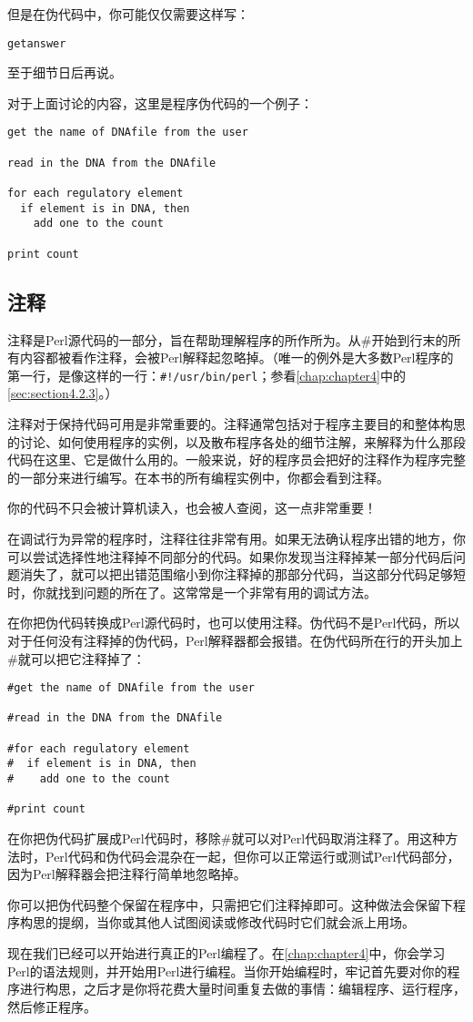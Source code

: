 但是在伪代码中，你可能仅仅需要这样写：

\begin{lstlisting}
getanswer
\end{lstlisting}

至于细节日后再说。

对于上面讨论的内容，这里是程序伪代码的一个例子：

\begin{lstlisting}
get the name of DNAfile from the user

read in the DNA from the DNAfile

for each regulatory element
  if element is in DNA, then
    add one to the count

print count
\end{lstlisting}

\subsection{注释}
注释是Perl源代码的一部分，旨在帮助理解程序的所作所为。从\#开始到行末的所有内容都被看作注释，会被Perl解释起忽略掉。（唯一的例外是大多数Perl程序的第一行，是像这样的一行：\verb|#!/usr/bin/perl|；参看\autoref{chap:chapter4}中的\autoref{sec:section4.2.3}。）

注释对于保持代码可用是非常重要的。注释通常包括对于程序主要目的和整体构思的讨论、如何使用程序的实例，以及散布程序各处的细节注解，来解释为什么那段代码在这里、它是做什么用的。一般来说，好的程序员会把好的注释作为程序完整的一部分来进行编写。在本书的所有编程实例中，你都会看到注释。

你的代码不只会被计算机读入，也会被人查阅，这一点非常重要！

在调试行为异常的程序时，注释往往非常有用。如果无法确认程序出错的地方，你可以尝试选择性地注释掉不同部分的代码。如果你发现当注释掉某一部分代码后问题消失了，就可以把出错范围缩小到你注释掉的那部分代码，当这部分代码足够短时，你就找到问题的所在了。这常常是一个非常有用的调试方法。

在你把伪代码转换成Perl源代码时，也可以使用注释。伪代码不是Perl代码，所以对于任何没有注释掉的伪代码，Perl解释器都会报错。在伪代码所在行的开头加上\#就可以把它注释掉了：

\begin{lstlisting}
#get the name of DNAfile from the user

#read in the DNA from the DNAfile

#for each regulatory element
#  if element is in DNA, then
#    add one to the count

#print count
\end{lstlisting}

在你把伪代码扩展成Perl代码时，移除\#就可以对Perl代码取消注释了。用这种方法时，Perl代码和伪代码会混杂在一起，但你可以正常运行或测试Perl代码部分，因为Perl解释器会把注释行简单地忽略掉。

你可以把伪代码整个保留在程序中，只需把它们注释掉即可。这种做法会保留下程序构思的提纲，当你或其他人试图阅读或修改代码时它们就会派上用场。

现在我们已经可以开始进行真正的Perl编程了。在\autoref{chap:chapter4}中，你会学习Perl的语法规则，并开始用Perl进行编程。当你开始编程时，牢记首先要对你的程序进行构思，之后才是你将花费大量时间重复去做的事情：编辑程序、运行程序，然后修正程序。
